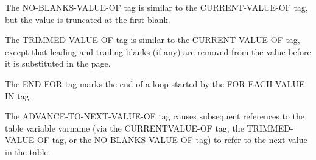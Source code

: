 \documentclass[letterpaper,10pt,english]{sphinxmanual}
\begin{document}
The NO-BLANKS-VALUE-OF tag is similar to the CURRENT-VALUE-OF tag, but the value is truncated at the first blank.


\begin{sphinxVerbatim}[commandchars=\\\{\}]
 
\end{sphinxVerbatim}

The TRIMMED-VALUE-OF tag is similar to the CURRENT-VALUE-OF tag, except that leading and trailing blanks (if any) are removed from the value before it is substituted in the page.


\begin{sphinxVerbatim}[commandchars=\\\{\}]
 
\end{sphinxVerbatim}

The END-FOR tag marks the end of a loop started by the FOR-EACH-VALUE-IN tag.


\begin{sphinxVerbatim}[commandchars=\\\{\}]
 
\end{sphinxVerbatim}

The ADVANCE-TO-NEXT-VALUE-OF tag causes subsequent references to the table variable varname (via the CURRENTVALUE-OF tag, the TRIMMED-VALUE-OF tag, or the NO-BLANKS-VALUE-OF tag) to refer to the next value in the table.


\begin{sphinxVerbatim}[commandchars=\\\{\}]
 
\end{sphinxVerbatim}
\end{document}
